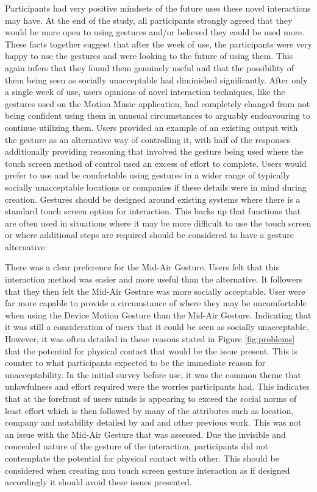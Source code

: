 \documentclass{l4proj}
\begin{document}
Participants had very positive mindsets of the future uses these novel interactions may have. At the end of the study, all participants strongly agreed that they would be more open to using gestures and/or believed they could be used more. These facts together suggest that after the week of use, the participants were very happy to use the gestures and were looking to the future of using them. This again infers that they found them genuinely useful and that the possibility of them being seen as socially unacceptable had diminished significantly. After only a single week of use, users opinions of novel interaction techniques, like the gestures used on the Motion Music application, had completely changed from not being confident using them in unusual circumstances to arguably endeavouring to continue utilizing them. Users provided an example of an existing output with the gesture as an alternative way of controlling it, with half of the responses additionally providing reasoning that involved the gesture being used where the touch screen method of control used an excess of effort to complete. Users would prefer to use and be comfortable using gestures in a wider range of typically socially unacceptable locations or companies if these details were in mind during creation. Gestures should be designed around existing systems where there is a standard touch screen option for interaction. This backs up that functions that are often used in situations where it may be more difficult to use the touch screen or where additional steps are required should be considered to have a gesture alternative. 

There was a clear preference for the Mid-Air Gesture. Users felt that this interaction method was easier and more useful than the alternative. It followers that they then felt the Mid-Air Gesture was more socially acceptable. User were far more capable to provide a circumstance of where they may be uncomfortable when using the Device Motion Gesture than the Mid-Air Gesture. Indicating that it was still a consideration of users that it could be seen as socially unacceptable. However, it was often detailed in these reasons stated in Figure \ref{fig:problems} that the potential for physical contact that would be the issue present. This is counter to what participants expected to be the immediate reason for unacceptability. In the initial survey before use, it was the common theme that unlawfulness and effort required were the worries participants had. This indicates that at the forefront of users minds is appearing to exceed the social norms of least effort which is then followed by many of the attributes such as location, company and notability detailed by \citet{rico_usable_2010} and \citet{pohl_focused_2013} and other previous work. This was not an issue with the Mid-Air Gesture that was assessed. Due the invisible and concealed nature of the gesture of the interaction, participants did not contemplate the potential for physical contact with other. This should be considered when creating non touch screen gesture interaction as if designed accordingly it should avoid these issues presented.
\end{document}
